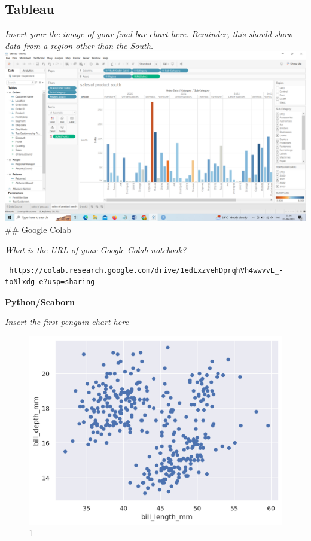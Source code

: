 \documentclass[
]{article}
\begin{document}
\hypertarget{tableau}{%
\subsection{Tableau}\label{tableau}}

\emph{Insert your the image of your final bar chart here. Reminder, this
should show data from a region other than the South.}
\includegraphics{tableau.png} \#\# Google Colab

\emph{What is the URL of your Google Colab notebook?}

\begin{verbatim}
 https://colab.research.google.com/drive/1edLxzvehDprqhVh4wwvvL_-toNlxdg-e?usp=sharing
\end{verbatim}

\textbf{Python/Seaborn}

\emph{Insert the first penguin chart here}

\begin{figure}
\centering
\includegraphics{1.png}
\caption{1}
\end{figure}
\end{document}
